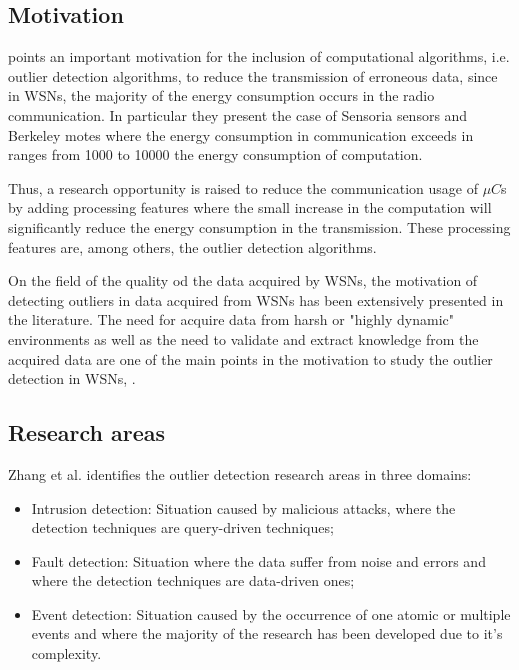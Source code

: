 \subsection{Motivation}

\cite{class:rajasegarar:2007} points an important motivation for the inclusion of computational algorithms, i.e. outlier detection algorithms, to reduce the transmission of erroneous data, since in WSNs, the majority of the energy consumption occurs in the radio communication. In particular they present the case of Sensoria sensors and Berkeley motes where the energy consumption in communication exceeds in ranges from 1000 to 10000 the energy consumption of computation.

Thus, a research opportunity is raised to reduce the communication usage of $\mu C$s by adding processing features where the small increase in the computation will significantly reduce the energy consumption in the transmission. These processing features are, among others, the outlier detection algorithms.


On the field of the quality od the data acquired by WSNs, the motivation of detecting outliers in data acquired from WSNs has been extensively presented in the literature. The need for acquire data from harsh or "highly dynamic" environments as well as the need to validate and extract knowledge from the acquired data are one of the main points in the motivation to study the outlier detection in WSNs,  \cite{gen:zhang:2010,gen:chandola:2009,stat:ghorbel:2015,class:martins:2015b}.



\subsection{Research areas}
Zhang et al. \cite{gen:zhang:2010} identifies the outlier detection research areas in three domains: 

\begin{itemize}
	\item Intrusion detection: Situation caused by malicious attacks, where the detection techniques are query-driven techniques;
	
	\item Fault detection: Situation where the data suffer from noise and errors and where the detection techniques are data-driven ones;
	
	\item Event detection: Situation caused by the occurrence of one atomic or multiple events and where the majority of the research has been developed due to it's complexity.
\end{itemize}

